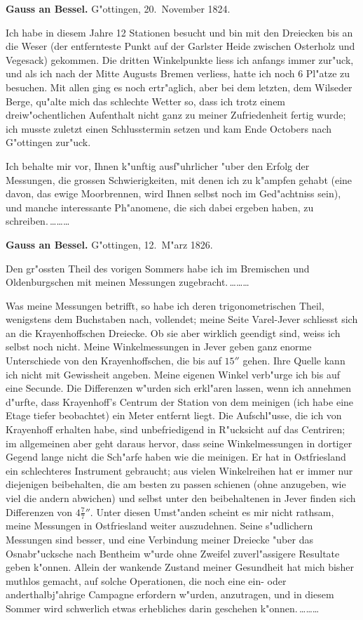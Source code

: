 \documentclass[12pt,a4paper]{article}
\theoremstyle{plain}
\theoremstyle{definition}
\theoremstyle{remark}
\begin{document}
\medskip
\noindent \textbf{Gauss an Bessel.} G"ottingen, 20.~November 1824.

\medskip
\noindent Ich habe in diesem Jahre 12 Stationen besucht und bin mit den Dreiecken bis an die Weser (der entfernteste Punkt auf der Garlster Heide zwischen Osterholz und Vegesack) gekommen. Die dritten Winkelpunkte liess ich anfangs immer zur"uck, und als ich nach der Mitte Augusts Bremen verliess, hatte ich noch 6 Pl"atze zu besuchen. Mit allen ging es noch ertr"aglich, aber bei dem letzten, dem Wilseder Berge, qu"alte mich das schlechte Wetter so, dass ich trotz einem dreiw"ochentlichen Aufenthalt nicht ganz zu meiner Zufriedenheit fertig wurde; ich musste zuletzt einen Schlusstermin setzen und kam Ende Octobers nach G"ottingen zur"uck.

Ich behalte mir vor, Ihnen k"unftig ausf"uhrlicher "uber den Erfolg der Messungen, die grossen Schwierigkeiten, mit denen ich zu k"ampfen gehabt (eine davon, das ewige Moorbrennen, wird Ihnen selbst noch im Ged"achtniss sein), und manche interessante Ph"anomene, die sich dabei ergeben haben, zu schreiben.\,\ldots\ldots\ldots

\medskip
\noindent \textbf{Gauss an Bessel.} G"ottingen, 12.~M"arz 1826.

\medskip
\noindent Den gr"ossten Theil des vorigen Sommers habe ich im Bremischen und Oldenburgschen mit meinen Messungen zugebracht.\,\ldots\ldots\ldots

Was meine Messungen betrifft, so habe ich deren trigonometrischen Theil, wenigstens dem Buchstaben nach, vollendet; meine Seite Varel-Jever schliesst sich an die Krayenhoffschen Dreiecke. Ob sie aber wirklich geendigt sind, weiss ich selbst noch nicht. Meine Winkelmessungen in Jever geben ganz enorme Unterschiede von den Krayenhoffschen, die bis auf $15''$ gehen. Ihre Quelle kann ich nicht mit Gewissheit angeben. Meine eigenen Winkel verb"urge ich bis auf eine Secunde. Die Differenzen w"urden sich erkl"aren lassen, wenn ich annehmen d"urfte, dass Krayenhoff's Centrum der Station von dem meinigen (ich habe eine Etage tiefer beobachtet) ein Meter entfernt liegt. Die Aufschl"usse, die ich von Krayenhoff erhalten habe, sind unbefriedigend in R"ucksicht auf das Centriren; im allgemeinen aber geht daraus hervor, dass seine Winkelmessungen in dortiger Gegend lange nicht die Sch"arfe haben wie die meinigen. Er hat in Ostfriesland ein schlechteres Instrument gebraucht; aus vielen Winkelreihen hat er immer nur diejenigen beibehalten, die am besten zu passen schienen (ohne anzugeben, wie viel die andern abwichen) und selbst unter den beibehaltenen in Jever finden sich Differenzen von $4\frac{7}{7}''$. Unter diesen Umst"anden scheint es mir nicht rathsam, meine Messungen in Ostfriesland weiter auszudehnen. Seine s"udlichern Messungen sind besser, und eine Verbindung meiner Dreiecke "uber das Osnabr"ucksche nach Bentheim w"urde ohne Zweifel zuverl"assigere Resultate geben k"onnen. Allein der wankende Zustand meiner Gesundheit hat mich bisher muthlos gemacht, auf solche Operationen, die noch eine ein- oder anderthalbj"ahrige Campagne erfordern w"urden, anzutragen, und in diesem Sommer wird schwerlich etwas erhebliches darin geschehen k"onnen.\,\ldots\ldots\ldots
\end{document}
